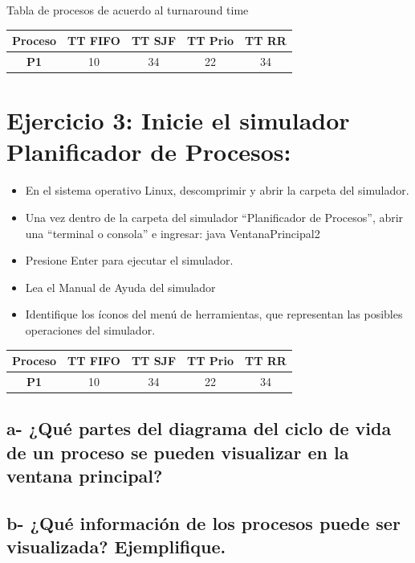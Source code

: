 \documentclass{article}
\begin{document}
  Tabla de procesos de acuerdo al turnaround time
  \begin{center}
    \begin{tabular}{|c|c|c|c|c|}   
    \hline
      \textbf{Proceso} & \textbf{TT FIFO} & \textbf{TT SJF} & \textbf{TT Prio} & \textbf{TT RR} \\
    \hline
      \textbf{P1} & 10 & 34 & 22 & 34 \\
    \hline
  \end{tabular}
 \end{center}

\section*{Ejercicio 3: Inicie el simulador Planificador de Procesos:}

\begin{itemize}
    \item En el sistema operativo Linux, descomprimir y abrir la carpeta del simulador.
    \item Una vez dentro de la carpeta del simulador “Planificador de Procesos”, abrir una “terminal o
consola” e ingresar: java VentanaPrincipal2
    \item Presione Enter para ejecutar el simulador.
    \item Lea el Manual de Ayuda del simulador
    \item Identifique los íconos del menú de herramientas, que representan las posibles operaciones del
simulador.
\end{itemize}

\begin{center}
    \begin{tabular}{|c|c|c|c|c|}   
    \hline
      \textbf{Proceso} & \textbf{TT FIFO} & \textbf{TT SJF} & \textbf{TT Prio} & \textbf{TT RR} \\
    \hline
      \textbf{P1} & 10 & 34 & 22 & 34 \\
    \hline
  \end{tabular}
 \end{center}


\subsection*{a- ¿Qué partes del diagrama del ciclo de vida de un proceso se pueden visualizar en la ventana
principal?}
\subsection*{b- ¿Qué información de los procesos puede ser visualizada? Ejemplifique.}
\end{document}

